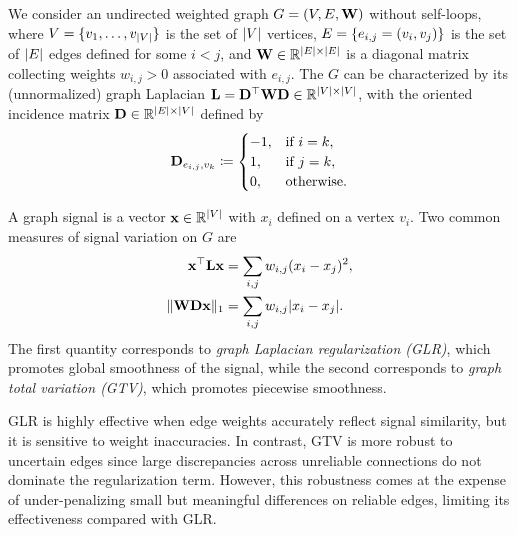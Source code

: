 We consider an undirected weighted graph $G = (V, E, \mathbf{W})$ without self-loops, where $V = \{ v_1, \dots, v_{\lvert V \rvert} \}$ is the set of $\lvert V \rvert$ vertices, $E = \{ e_{i,j} = (v_i, v_j) \}$ is the set of $\lvert E \rvert$ edges defined for some $i < j$, and $\mathbf{W} \in \mathbb{R}^{\lvert E \rvert \times \lvert E \rvert}$ is a diagonal matrix collecting weights $w_{i,j} > 0$ associated with $e_{i, j}$.
The $G$ can be characterized by its (unnormalized) graph Laplacian $\mathbf{L} = \mathbf{D}^{\top} \mathbf{W} \mathbf{D} \in \mathbb{R}^{|V| \times |V|}$, with the oriented incidence matrix $\mathbf{D} \in \mathbb{R}^{|E| \times |V|}$ defined by
\begin{equation}
    \mathbf{D}_{e_{i,j}, v_k} \coloneqq
    \begin{cases}
        -1, & \text{if } i = k, \\
        1,  & \text{if } j = k, \\
        0,  & \text{otherwise}.
    \end{cases}
\end{equation}

A graph signal is a vector $\mathbf{x} \in \mathbb{R}^{\lvert V \rvert}$ with $x_i$ defined on a vertex $v_i$. 
Two common measures of signal variation on $G$ are
\begin{align}
    \label{eq:glr}
    \mathbf{x}^{\top} \mathbf{L} \mathbf{x} &= \sum_{i,j} w_{i,j} (x_i - x_j)^2, \\
    \label{eq:gtv}
    \lVert \mathbf{W} \mathbf{D} \mathbf{x} \rVert_1 &= \sum_{i,j} w_{i,j} \lvert x_i - x_j \rvert.
\end{align}
The first quantity corresponds to \emph{graph Laplacian regularization (GLR)}, which promotes global smoothness of the signal, while the second corresponds to \emph{graph total variation (GTV)}, which promotes piecewise smoothness. 

GLR is highly effective when edge weights accurately reflect signal similarity, but it is sensitive to weight inaccuracies. 
In contrast, GTV is more robust to uncertain edges since large discrepancies across unreliable connections do not dominate the regularization term. 
However, this robustness comes at the expense of under-penalizing small but meaningful differences on reliable edges, limiting its effectiveness compared with GLR.